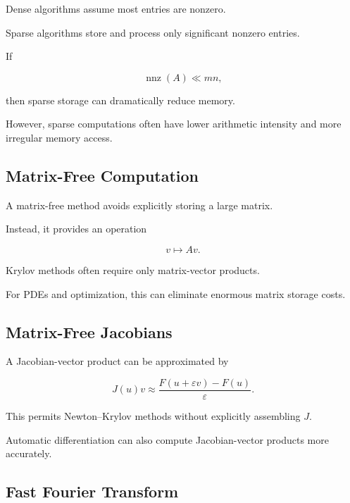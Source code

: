 Dense algorithms assume most entries are nonzero.

Sparse algorithms store and process only significant nonzero entries.

If

\[
\operatorname{nnz}(A)
\ll
mn,
\]

then sparse storage can dramatically reduce memory.

However, sparse computations often have lower arithmetic intensity and
more irregular memory access.

\subsection{Matrix-Free Computation}
\label{subsec:matrix-free-computation}

A matrix-free method avoids explicitly storing a large matrix.

Instead, it provides an operation

\[
\boxed{
v
\mapsto
Av.
}
\]

Krylov methods often require only matrix-vector products.

For PDEs and optimization, this can eliminate enormous matrix storage
costs.

\subsection{Matrix-Free Jacobians}
\label{subsec:matrix-free-jacobians}

A Jacobian-vector product can be approximated by

\[
\boxed{
J(u)v
\approx
\frac{
F(u+\varepsilon v)-F(u)
}{
\varepsilon
}.
}
\]

This permits Newton--Krylov methods without explicitly assembling \(J\).

Automatic differentiation can also compute Jacobian-vector products more
accurately.

\subsection{Fast Fourier Transform}
\label{subsec:fast-fourier-transform}

